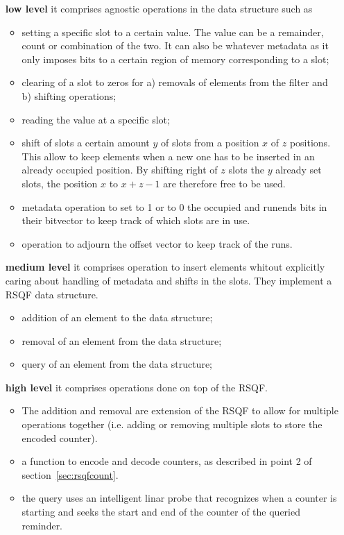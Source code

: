 \begin{itemize}
	\item[\textbf{low level}] it comprises agnostic operations in the data structure such as
	\begin{itemize}
		\item setting a specific slot to a certain value. The value can be a remainder, count or combination of the two. It can also be whatever metadata as it only imposes bits to a certain region of memory corresponding to a slot;
		\item clearing of a slot to zeros for a) removals of elements from the filter and b) shifting operations;
		\item reading the value at a specific slot;
		\item shift of slots a certain amount $y$ of slots from a position $x$ of $z$ positions. This allow to keep elements when a new one has to be inserted in an already occupied position. By shifting right of $z$ slots the $y$ already set slots, the position $x$ to $x+z-1$ are therefore free to be used.
		\item metadata operation to set to 1 or to 0 the occupied and runends bits in their bitvector to keep track of which slots are in use.
		\item operation to adjourn the offset vector to keep track of the runs.
	\end{itemize}
	\item[\textbf{medium level}] it comprises operation to insert elements whitout explicitly caring about handling of metadata and shifts in the slots. They implement a RSQF data structure.
	\begin{itemize}
		\item addition of an element to the data structure;
		\item removal of an element from the data structure;
		\item query of an element from the data structure;
	\end{itemize}
	\item[\textbf{high level}] it comprises operations done on top of the RSQF. 
	\begin{itemize}
		\item The addition and removal are extension of the RSQF to allow for multiple operations together (i.e. adding or removing multiple slots to store the encoded counter).
		\item a function to encode and decode counters, as described in point 2 of section~\ref{sec:rsqfcount}.
		\item the query uses an intelligent linar probe that recognizes when a counter is starting and seeks the start and end of the counter of the queried reminder.

\end{itemize}
\end{itemize}
